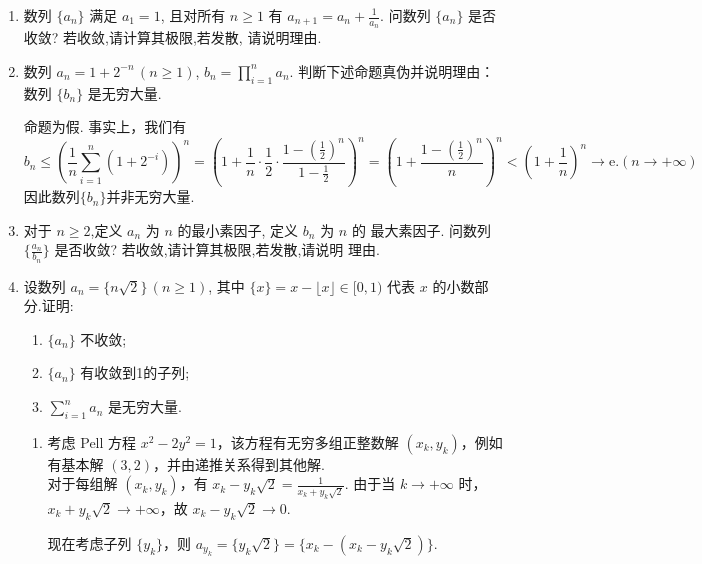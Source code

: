 \begin{enumerate}
    \item[2.]数列 $\{a_{n}\}$ 满足 $a_{1} = 1$, 且对所有 $n\geq 1$ 有 $\displaystyle a_{n + 1} = 
    a_{n} + \frac{1}{a_{n}}$. 问数列 $\{a_{n}\}$ 是否收敛? 若收敛,请计算其极限,若发散,
    请说明理由.

    \item[3.]数列 $\displaystyle a_{n} = 1 + 2^{-n}\,(n\geq 1)$, $\displaystyle b_{n} = \prod_{i = 1}^{n}
    a_{n}$. 判断下述命题真伪并说明理由：数列 $\{b_{n}\}$ 是无穷大量.
    \begin{solution}
    命题为假. 事实上，我们有
    \[
    b_{n}\leq \left(\frac{1}{n} \sum_{i=1}^{n}(1+2^{-i})\right)^n 
    \displaystyle=\left(1+\frac{1}{n}\cdot\frac{1}{2}\cdot\frac{1-(\frac{1}{2})^n}{1-\frac{1}{2}}\right)^n
    \displaystyle=\left(1+\frac{1-(\frac{1}{2})^n}{n}\right)^n
    <\left(1+\frac{1}{n}\right)^n\rightarrow \mathrm{e}. (n\to+\infty)
    \]
    因此数列$\{b_{n}\}$并非无穷大量.
    \end{solution}

    \item[4.]对于 $n\geq 2$,定义 $a_{n}$ 为 $n$ 的最小素因子, 定义 $b_{n}$ 为 $n$ 的
    最大素因子. 问数列 $\displaystyle\biggl\{\frac{a_{n}}{b_{n}}\biggr\}$ 是否收敛? 若收敛,请计算其极限,若发散,请说明
    理由.

    \item[5.]设数列 $a_{n} = \{n\sqrt{2}\}\,(n\geq 1)$, 其中 $\{x\} = x - \lfloor x\rfloor \in [0,1)$ 
    代表 $x$ 的小数部分.证明:
    \begin{enumerate}
        \item[(a)]$\{a_{n}\}$ 不收敛;
        \item[(b)]$\{a_{n}\}$ 有收敛到1的子列;
        \item[(c)]$\displaystyle \sum_{i = 1}^{n}a_{n}$ 是无穷大量.
    \end{enumerate}
    \begin{solution}
        \begin{enumerate}
            \item[(b)]
            考虑 Pell 方程 $x^2-2y^2=1$，该方程有无穷多组正整数解 $(x_{k},y_{k})$，例如有基本解 $(3,2)$，并由递推关系得到其他解.\\
            对于每组解 $(x_{k},y_{k})$，有
            $\displaystyle x_{k}-y_{k}\sqrt{2}=\frac{1}{x_{k}+y_{k}\sqrt{2}}.$
            由于当 $k\to+\infty$ 时，$x_{k}+y_{k}\sqrt{2} \to +\infty$，故 $x_{k}-y_{k}\sqrt{2}\to 0$.
            
            现在考虑子列 $\{y_{k}\}$，则 $\displaystyle a_{y_{k}}=\{y_{k}\sqrt{2}\}=\{x_{k}-(x_{k}-y_{k}\sqrt{2})\}.$
            

\end{enumerate}
\end{solution}
\end{enumerate}
